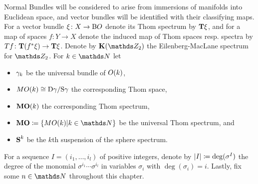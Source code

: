 \begin{Not*}
  Normal Bundles will be considered to arise from immersions of
  manifolds into Euclidean space, and
  vector bundles will be identified with their classifying maps.
  For a vector bundle $\xi\colon X\to\mathrm{B}O$ denote its Thom spectrum by
  $\bm{\mathrm{T}}{\xi}$,
  and for a map of spaces $f\colon Y\to X$ denote the induced map of
  Thom spaces resp. spectra by
  $T{f}\colon\bm{\mathrm{T}}{({f}^*\xi)}\to\bm{\mathrm{T}}{\xi}$.
  Denote by $\EMspec$ the Eilenberg-MacLane spectrum for $\Zmod2$.
  For $k\in\Nat$ let
  \begin{itemize}
  \item $\gamma_{k}$ be the universal bundle of $O(k)$, 
  \item $MO(k)\cong\mathrm{D}\gamma_{}/\mathrm{S}\gamma_{}$ the corresponding Thom space,
  \item $\bm{\mathrm{MO}}(k)$ the corresponding Thom spectrum,
  \item $\MOspec\coloneqq\{\MO(k)|k\in\Nat\}$ be the universal Thom
    spectrum, and
  \item $\bm{\mathrm{S}}^{k}$ be the $k$th suspension of the sphere spectrum.
  \end{itemize}
  For a sequence $I=(i_1,\dotsc,i_l)$ of positive integers, denote by
  $\left|I\right|\coloneqq\deg(\sigma^I)$ the degree of the monomial
  $\sigma^{i_1}\dotsm\sigma^{i_l}$ in variables $\sigma_i$ with
  $\deg(\sigma_i)=i$.
  Lastly, fix some $n\in\Nat$ throughout this chapter.
\end{Not*}


